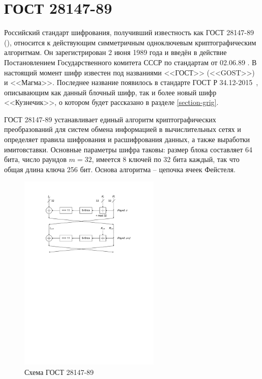 \section{ГОСТ 28147-89}

Российский стандарт шифрования, получивший известность как ГОСТ 28147-89 (\cite{GOST-89}), относится к действующим симметричным одноключевым криптографическим алгоритмам. Он зарегистрирован 2 июня 1989 года и введён в действие Постановлением Государственного комитета СССР по стандартам от 02.06.89 . В настоящий момент шифр известен под названиями <<ГОСТ>> (<<GOST>>) и <<Магма>>. Последнее название появилось в стандарте ГОСТ Р 34.12-2015~\cite{GOST-R:34.12-2015}, описывающим как данный блочный шифр, так и более новый шифр <<Кузнечик>>, о котором будет рассказано в разделе \ref{section-grig}.

ГОСТ 28147-89 устанавливает единый алгоритм криптографических преобразований для систем обмена информацией в вычислительных сетях и определяет правила шифрования и расшифрования данных, а также выработки имитовставки. Основные параметры шифра таковы: размер блока составляет 64 бита, число раундов $m=32$, имеется 8 ключей по 32 бита каждый, так что общая длина ключа 256 бит. Основа алгоритма -- цепочка ячеек Фейстеля.

\begin{figure}[!ht]
    \centering
    \includegraphics[width=0.6\textwidth]{pic/gost-28147-89}
    \caption{Схема ГОСТ 28147-89\label{fig:gost-28147-89}}
\end{figure}

